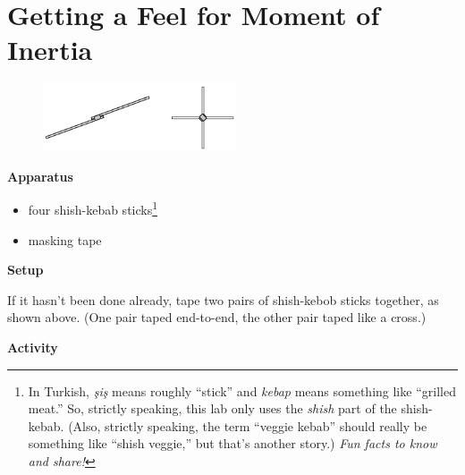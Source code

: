 \section{Getting a Feel for Moment of Inertia}

\makelabheader %

\begin{figure}
    \vspace{-0.3in}
    \includegraphics[width=0.51\textwidth]{moment_inertia_feel/stick_pics1.eps}
\end{figure}

\bigskip
\textbf{Apparatus}

\begin{itemize}[nosep]
\item four shish-kebab sticks\footnote{In Turkish, \textit{\c{s}i\c{s}} means roughly ``stick'' and \textit{kebap} means something like ``grilled meat.''  So, strictly speaking, this lab only uses the \textit{shish} part of the shish-kebab.  (Also, strictly speaking, the term ``veggie kebab'' should really be something like ``shish veggie,'' but that's another story.)  \textit{Fun facts to know and share!}}
\item masking tape
\end{itemize}

\bigskip
\textbf{Setup}

If it hasn't been done already, tape two pairs of shish-kebob sticks together, as shown above.  (One pair taped end-to-end, the other pair taped like a cross.)

\bigskip
\textbf{Activity}

